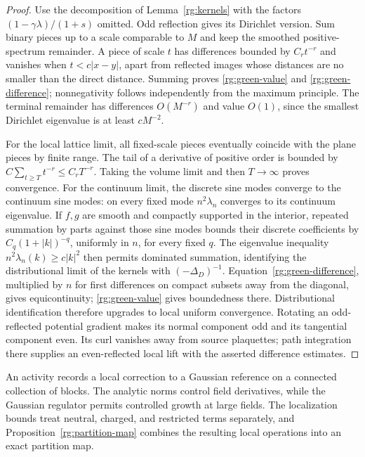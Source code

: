 \begin{proof}
Use the decomposition of Lemma~\ref{rg:kernels} with the factors $(1-\gamma\lambda)/(1+s)$ omitted.  Odd reflection gives its Dirichlet version.  Sum binary pieces up to a scale comparable to $M$ and keep the smoothed positive-spectrum remainder.  A piece of scale $t$ has differences bounded by $C_rt^{-r}$ and vanishes when $t<c|x-y|$, apart from reflected images whose distances are no smaller than the direct distance.  Summing proves \eqref{rg:green-value} and \eqref{rg:green-difference}; nonnegativity follows independently from the maximum principle.  The terminal remainder has differences $O(M^{-r})$ and value $O(1)$, since the smallest Dirichlet eigenvalue is at least $cM^{-2}$.

For the local lattice limit, all fixed-scale pieces eventually coincide with the plane pieces by finite range.  The tail of a derivative of positive order is bounded by $C\sum_{t\ge T}t^{-r}\le C_rT^{-r}$.  Taking the volume limit and then $T\to\infty$ proves convergence.  For the continuum limit, the discrete sine modes converge to the continuum sine modes: on every fixed mode $n^2\lambda_n$ converges to its continuum eigenvalue.  If $f,g$ are smooth and compactly supported in the interior, repeated summation by parts against those sine modes bounds their discrete coefficients by $C_q(1+|k|)^{-q}$, uniformly in $n$, for every fixed $q$.  The eigenvalue inequality $n^2\lambda_n(k)\ge c|k|^2$ then permits dominated summation, identifying the distributional limit of the kernels with $(-\Delta_D)^{-1}$.  Equation~\eqref{rg:green-difference}, multiplied by $n$ for first differences on compact subsets away from the diagonal, gives equicontinuity; \eqref{rg:green-value} gives boundedness there.  Distributional identification therefore upgrades to local uniform convergence.  Rotating an odd-reflected potential gradient makes its normal component odd and its tangential component even.  Its curl vanishes away from source plaquettes; path integration there supplies an even-reflected local lift with the asserted difference estimates.
\end{proof}

An activity records a local correction to a Gaussian reference on a
connected collection of blocks.
The analytic norms control field derivatives, while the Gaussian
regulator permits controlled growth at large fields.
The localization bounds treat neutral, charged, and restricted terms
separately, and Proposition~\ref{rg:partition-map} combines the
resulting local operations into an exact partition map.

